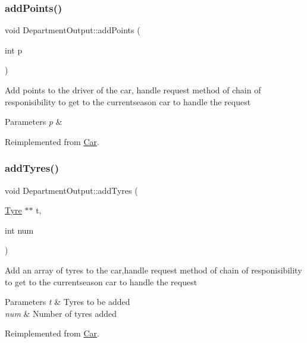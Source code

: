 \subsubsection{\texorpdfstring{add\+Points()}{addPoints()}}
{\footnotesize\ttfamily void Department\+Output\+::add\+Points (\begin{DoxyParamCaption}\item[{int}]{p }\end{DoxyParamCaption})\hspace{0.3cm}{\ttfamily [virtual]}}

Add points to the driver of the car, handle request method of chain of responisibility to get to the currentseason car to handle the request 
\begin{DoxyParams}{Parameters}
{\em p} & \\
\hline
\end{DoxyParams}


Reimplemented from \hyperlink{classCar_a946872fcdb7625c343e5caf90fa39617}{Car}.

\mbox{\label{classDepartmentOutput_a7f231762cf94d1f18a2e7bb3290afbda}} 
\subsubsection{\texorpdfstring{add\+Tyres()}{addTyres()}}
{\footnotesize\ttfamily void Department\+Output\+::add\+Tyres (\begin{DoxyParamCaption}\item[{\hyperlink{classTyre}{Tyre} $\ast$$\ast$}]{t,  }\item[{int}]{num }\end{DoxyParamCaption})\hspace{0.3cm}{\ttfamily [virtual]}}

Add an array of tyres to the car,handle request method of chain of responisibility to get to the currentseason car to handle the request 
\begin{DoxyParams}{Parameters}
{\em t} & Tyres to be added \\
\hline
{\em num} & Number of tyres added \\
\hline
\end{DoxyParams}


Reimplemented from \hyperlink{classCar_a5c5f22cb9232b88a53a4ffc324824aa1}{Car}.

